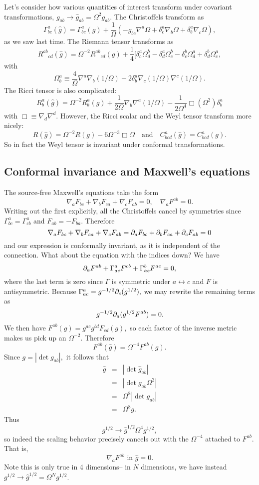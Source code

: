 Let's consider how various quantities of interest transform under covariant transformations,
$g_{ab}\to \hat g_{ab}=\Omega^2 g_{ab}.$
The Christoffels transform as
$$\Gamma^a_{bc}(\hat g)=\Gamma^a_{bc}(g)+\frac{1}{\Omega}(-g_{bc}\nabla^a \Omega +\delta^a_c \nabla_b \Omega +\delta^a_b \nabla_c \Omega),$$
as we saw last time. The Riemann tensor transforms as
$${R^{ab}}_{cd}(\hat g)=\Omega^{-2}{R^{ab}}_{cd}(g)+\frac{1}{4}[\delta^a_c \Omega^b_d - \delta^a_d \Omega^b_c -\delta^b_c \Omega^a_d +\delta^b_d \Omega^a_c,$$
with $$\Omega^a_b\equiv \frac{4}{\Omega}\nabla^a \nabla_b (1/\Omega)-2\delta^a_b \nabla_c(1/\Omega) \nabla^c(1/\Omega).$$
The Ricci tensor is also complicated:
$$R^a_b(\hat g)=\Omega^{-2}R^a_b(g) +\frac{1}{2\Omega}\nabla_b \nabla^a (1/\Omega)-\frac{1}{2\Omega^4}\Box (\Omega^2)\delta^a_b$$
with $\Box\equiv \nabla_d \nabla^d.$ However, the Ricci scalar and the Weyl tensor transform more nicely:
\begin{equation}\label{ricciconformal}
R(\hat g)=\Omega^{-2}R(g)-6\Omega^{-3}\Box \Omega \quad\text{and}\quad C^a_{bcd}(\hat g)=C^a_{bcd}(g).
\end{equation}
So in fact the Weyl tensor is invariant under conformal transformations.

\subsection*{Conformal invariance and Maxwell's equations} The source-free Maxwell's equations take the form
$$\nabla_a F_{bc}+\nabla_b F_{ca}+\nabla_c F_{ab}=0, \quad \nabla_a F^{ab}=0.$$
Writing out the first explicitly, all the Christoffels cancel by symmetries since $\Gamma^a_{bc}=\Gamma^a_{cb}$ and $F_{ab}=-F_{ba}.$ Therefore 
$$\nabla_a F_{bc}+\nabla_b F_{ca}+\nabla_c F_{ab}= \partial_a F_{bc} + \partial_b F_{ca}+\partial_c F_{ab}=0$$ and our expression is conformally invariant, as it is independent of the connection. What about the equation with the indices down? We have
$$\partial_a F^{ab}+\Gamma^a_{ac} F^{cb}+\Gamma^b_{ac} F^{ac}=0,$$
where the last term is zero since $\Gamma$ is symmetric under $a\leftrightarrow c$ and $F$ is antisymmetric. Because $\Gamma^a_{ac}=g^{-1/2}\partial_c (g^{1/2}),$ we may rewrite the remaining terms as
$$g^{-1/2}\partial_a (g^{1/2}F^{ab})=0.$$
We then have $F^{ab}(g)=g^{ac} g^{bd}F_{cd}(g),$ so each factor of the inverse metric makes us pick up an $\Omega^{-2}$. Therefore
$$F^{ab}(\hat g)=\Omega^{-4}F^{ab}(g).$$
Since $g=|\det g_{ab}|,$ it follows that
\begin{eqnarray*}
\hat g&=&|\det \hat g_{ab}|\\
&=&|\det g_{ab} \Omega^2|\\
&=&\Omega^8 |\det g_{ab}|\\
&=&\Omega^8 g.
\end{eqnarray*}
Thus $$g^{1/2}\to \hat g^{1/2}\Omega^4 g^{1/2},$$ so indeed the scaling behavior precisely cancels out with the $\Omega^{-4}$ attached to $F^{ab}$. That is,
$$\nabla_a F^{ab}\text{ in }\hat g=0.$$
Note this is only true in 4 dimensions-- in $N$ dimensions, we have instead $g^{1/2}\to \hat g^{1/2}=\Omega^N g^{1/2}$.

